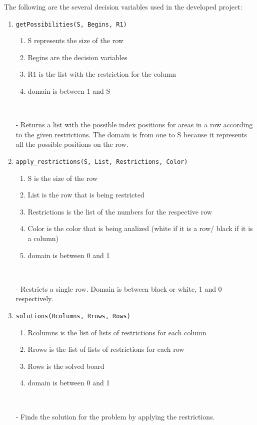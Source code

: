 \documentclass[runningheads,a4paper]{llncs}
\begin{document}
	The following are the several decision variables used in the developed project: 
		\begin{enumerate}
			\item \verb|getPossibilities(S, Begins, R1)|
			\begin{enumerate}
				\item S represents the size of the row
				\item Begins are the decision variables
				\item R1 is the list with the restriction for the column
				\item domain is between 1 and S 
			\end{enumerate}
		\

			 - Returns a list with the possible index positions for areas in a row according to the given restrictions.
			The domain is from one to S because it represents all the possible positions on the row.

			 \item \verb|apply_restrictions(S, List, Restrictions, Color)|
			\begin{enumerate}
				\item S is the size of the row
				\item List is the row that is being restricted
				\item Restrictions is the list of the numbers for the respective row
				\item Color is the color that is being analized (white if it is a row/ black if it is a column)
				\item domain is between 0 and 1
			\end{enumerate}
		\

			- Restricts a single row. Domain is between black or white, 1 and 0 respectively.
	

			\item \verb|solutions(Rcolumns, Rrows, Rows)|
				\begin{enumerate}
				\item Rcolumns is the list of lists of restrictions for each column
				\item Rrows is the list of lists of restrictions for each row
				\item Rows is the solved board
				\item domain is between 0 and 1
			\end{enumerate}
		\

			- Finds the solution for the problem by applying the restrictions.
		\end{enumerate}
		
\end{document}
